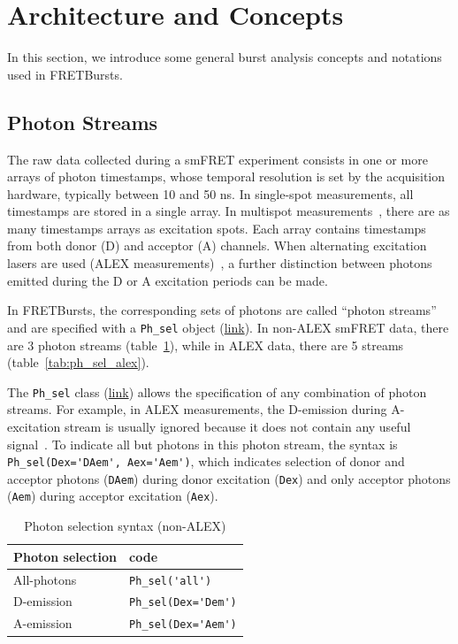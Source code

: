 \documentclass[10pt,letterpaper]{article}
\begin{document}
\section{Architecture and Concepts}
\label{sec:concepts}

In this section, we introduce some general burst analysis concepts 
and notations used in FRETBursts.

\subsection{Photon Streams}
\label{sec:ph_streams}

The raw data collected during a smFRET experiment consists in one or more arrays of 
photon timestamps, whose temporal resolution is set by the acquisition hardware, 
typically between 10 and 50 ns.
In single-spot measurements, all timestamps are stored in a single array. In multispot
measurements~\cite{Ingargiola_2013}, there are as many timestamps arrays
as excitation spots.
Each array contains timestamps from both donor (D) and acceptor (A) channels.
When alternating excitation lasers are used (ALEX measurements)~\cite{Lee_2005}, 
a further distinction between photons emitted during the D or A excitation periods can be made. 

In FRETBursts, the corresponding sets of photons are called ``photon streams'' and are
specified with a \verb|Ph_sel| object
(\href{http://fretbursts.readthedocs.org/en/latest/ph_sel.html}{link}).
In non-ALEX smFRET data, there are 3 photon streams
(table~\ref{tab:ph_sel_smfret}), while in ALEX data, there are 5 streams (table~\ref{tab:ph_sel_alex}).

The \verb|Ph_sel| class (\href{http://fretbursts.readthedocs.org/en/latest/ph_sel.html}{link})
allows the specification of any combination of photon streams.
For example, in ALEX measurements, the D-emission during A-excitation stream is
usually ignored because it does not contain any useful signal~\cite{Lee_2005}.
To indicate all but photons in this photon stream, the syntax is
\verb|Ph_sel(Dex='DAem', Aex='Aem')|, which indicates selection of donor
and acceptor photons (\verb|DAem|) during donor excitation (\verb|Dex|) and only acceptor
photons (\verb|Aem|) during acceptor excitation (\verb|Aex|).

\begin{table}
\begin{tabular}{l|l}
  Photon selection  & code \\
  \hline
  All-photons       & \verb|Ph_sel('all')|\\
  D-emission    & \verb|Ph_sel(Dex='Dem')|\\
  A-emission & \verb|Ph_sel(Dex='Aem')|\\
\end{tabular}
\caption{\label{tab:ph_sel_smfret}Photon selection syntax (non-ALEX)}
\end{table}
\end{document}
